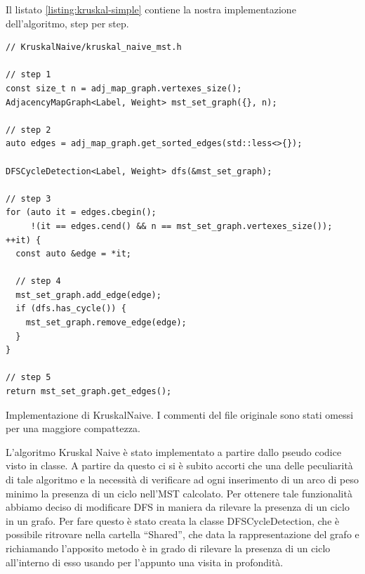 \noindent Il listato \ref{listing:kruskal-simple} contiene la nostra implementazione dell'algoritmo, step per step.

\begin{listing}[!ht]
\begin{verbatim}
// KruskalNaive/kruskal_naive_mst.h

// step 1
const size_t n = adj_map_graph.vertexes_size();
AdjacencyMapGraph<Label, Weight> mst_set_graph({}, n);

// step 2
auto edges = adj_map_graph.get_sorted_edges(std::less<>{});

DFSCycleDetection<Label, Weight> dfs(&mst_set_graph);

// step 3
for (auto it = edges.cbegin();
     !(it == edges.cend() && n == mst_set_graph.vertexes_size()); ++it) {
  const auto &edge = *it;

  // step 4
  mst_set_graph.add_edge(edge);
  if (dfs.has_cycle()) {
    mst_set_graph.remove_edge(edge);
  }
}

// step 5
return mst_set_graph.get_edges();
\end{verbatim}
\caption{Implementazione di KruskalNaive. I commenti del file originale sono stati omessi per una maggiore compattezza.}
\label{listing:kruskal-simple}
\end{listing}

\noindent L'algoritmo Kruskal Naive è stato implementato a partire dallo pseudo codice visto in classe. A partire da questo ci si è subito accorti che una delle peculiarità di tale algoritmo e la necessità di verificare ad ogni inserimento di un arco di peso minimo la presenza di un ciclo nell'MST calcolato. Per ottenere tale funzionalità abbiamo deciso di modificare DFS in maniera da rilevare la presenza di un ciclo in un grafo. Per fare questo è stato creata la classe DFSCycleDetection, che è possibile ritrovare nella cartella ``Shared'', che data la rappresentazione del grafo e richiamando l'apposito metodo  è in grado di rilevare la presenza di un ciclo all'interno di esso usando per l'appunto una visita in profondità.\\

